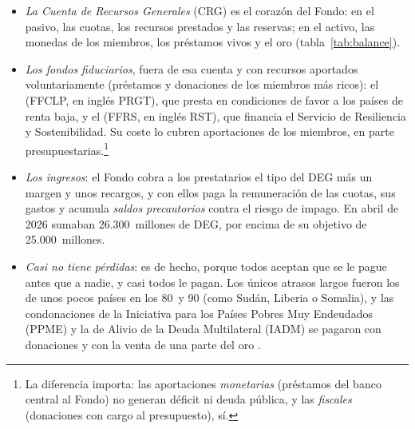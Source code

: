 \documentclass[11pt]{article}
\begin{document}
\begin{itemize}
\item \emph{La Cuenta de Recursos Generales} (CRG) es el corazón del Fondo: en el pasivo, las cuotas, los recursos prestados y las reservas; en el activo, las monedas de los miembros, los préstamos vivos y el oro (tabla~\ref{tab:balance}).
\item \emph{Los fondos fiduciarios}, fuera de esa cuenta y con recursos aportados voluntariamente (préstamos y donaciones de los miembros más ricos): el  (FFCLP, en inglés PRGT), que presta en condiciones de favor a los países de renta baja, y el  (FFRS, en inglés RST), que financia el Servicio de Resiliencia y Sostenibilidad. Su coste lo cubren aportaciones de los miembros, en parte presupuestarias.\footnote{La diferencia importa: las aportaciones \emph{monetarias} (préstamos del banco central al Fondo) no generan déficit ni deuda pública, y las \emph{fiscales} (donaciones con cargo al presupuesto), sí.}
\item \emph{Los ingresos}: el Fondo cobra a los prestatarios el tipo del DEG más un margen y unos recargos, y con ellos paga la remuneración de las cuotas, sus gastos y acumula \emph{saldos precautorios} contra el riesgo de impago. En abril de 2026 sumaban 26.300~millones de DEG, por encima de su objetivo de 25.000~millones\nocite{FMI2026SaldosPrecautorios}.
\item \emph{Casi no tiene pérdidas}: es  de hecho, porque todos aceptan que se le pague antes que a nadie, y casi todos le pagan. Los únicos atrasos largos fueron los de unos pocos países en los 80~y 90 (como Sudán, Liberia o Somalia), y las condonaciones de la Iniciativa para los Países Pobres Muy Endeudados (PPME) y la de Alivio de la Deuda Multilateral (IADM) se pagaron con donaciones y con la venta de una parte del oro .
\end{itemize}
\end{document}
